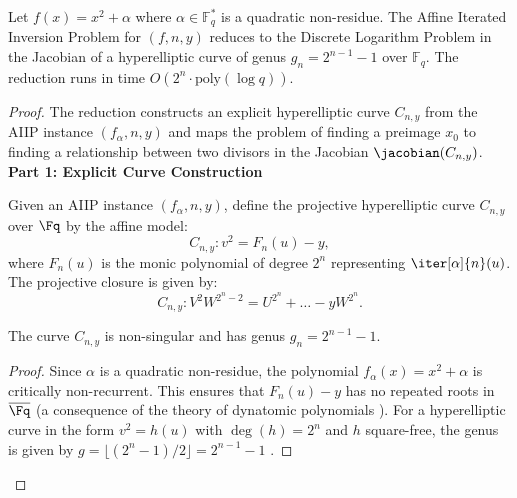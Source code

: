 \begin{theorem}\label{thm:aiip-hcdlp}
Let $f(x) = x^2 + \alpha$ where $\alpha \in \mathbb{F}_q^*$ is a quadratic non-residue. The Affine Iterated Inversion Problem for $(f, n, y)$ reduces to the Discrete Logarithm Problem in the Jacobian of a hyperelliptic curve of genus $g_n = 2^{n-1} - 1$ over $\mathbb{F}_q$. The reduction runs in time $O(2^n \cdot \text{poly}(\log q))$.
\end{theorem}
        \begin{proof}
            The reduction constructs an explicit hyperelliptic curve \( C_{n,y} \) from the AIIP instance \((f_\alpha, n, y)\) and maps the problem of finding a preimage \(x_0\) to finding a relationship between two divisors in the Jacobian \(\jacobian(C_{n,y})\).
            \textbf{Part 1: Explicit Curve Construction}
                \begin{definition}
                    Given an AIIP instance \((f_\alpha, n, y)\), define the projective hyperelliptic curve \(C_{n,y}\) over \(\Fq\) by the affine model:
                    \begin{equation}\label{eq:curve-def}
                        C_{n,y}: v^2 = F_n(u) - y,
                    \end{equation}
                    where \(F_n(u)\) is the monic polynomial of degree \(2^n\) representing \(\iter[\alpha]{n}(u)\). The projective closure is given by:
                    \begin{equation}
                        C_{n,y}: V^2W^{2^n-2} = U^{2^n} + \dots - y W^{2^n}.
                    \end{equation}
                \end{definition}
                \begin{lemma}\label{lemma:genus}
                    The curve \(C_{n,y}\) is non-singular and has genus \(g_n = 2^{n-1} - 1\).
                \end{lemma}
                \begin{proof}
                    Since \(\alpha\) is a quadratic non-residue, the polynomial \(f_\alpha(x) = x^2 + \alpha\) is critically non-recurrent. This ensures that \(F_n(u) - y\) has no repeated roots in \(\overline{\Fq}\) (a consequence of the theory of dynatomic polynomials \cite[Chapter 4]{Silverman2007}). For a hyperelliptic curve in the form \(v^2 = h(u)\) with \(\deg(h) = 2^n\) and \(h\) square-free, the genus is given by \(g = \lfloor (2^n - 1)/2 \rfloor = 2^{n-1} - 1\) \cite[Proposition 7.4.24]{Cohen2010}.

\end{proof}
\end{proof}
